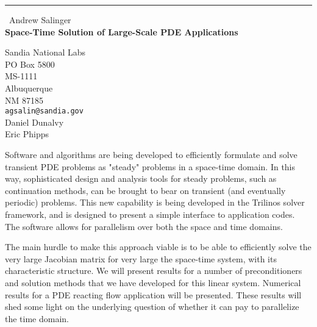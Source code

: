 \documentclass{report}
\begin{document}
\begin{center}
\rule{6in}{1pt} \
{\large Andrew Salinger \\
{\bf Space-Time Solution of Large-Scale PDE Applications}}

Sandia National Labs \\ PO Box 5800 \\ MS-1111 \\ Albuquerque \\ NM 87185
\\
{\tt agsalin@sandia.gov}\\
Daniel Dunalvy\\
Eric Phipps\end{center}

Software and algorithms are being developed to efficiently
formulate and solve transient PDE problems as "steady"
problems in a space-time domain. In this way, sophisticated
design and analysis tools for steady problems, such as
continuation methods, can be brought to bear on transient
(and eventually periodic) problems. This new capability is
being developed in the Trilinos solver framework, and is
designed to present a simple interface to application codes.
The software allows for parallelism over both the space and
time domains.

The main hurdle to make this approach viable is to be able
to efficiently solve the very large Jacobian matrix for very
large the space-time system, with its characteristic structure.
We will present results for a number of preconditioners and
solution methods that we have developed for this linear system.
Numerical results for a PDE reacting flow application will be
presented. These results will shed some light on the underlying
question of whether it can pay to parallelize the time domain.
\end{document}
